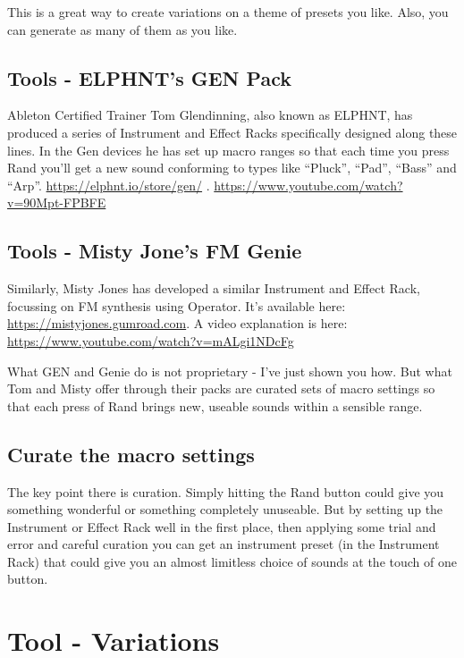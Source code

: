 \documentclass[
  12pt,
  letterpaper,
  oneside,
  open=any]{scrbook}
\begin{document}
This is a great way to create variations on a theme of presets you like.
Also, you can generate as many of them as you like.

\section{Tools - ELPHNT's GEN Pack}\label{tools---elphnts-gen-pack}

Ableton Certified Trainer Tom Glendinning, also known as ELPHNT, has
produced a series of Instrument and Effect Racks specifically designed
along these lines. In the Gen devices he has set up macro ranges so that
each time you press Rand you'll get a new sound conforming to types like
``Pluck'', ``Pad'', ``Bass'' and ``Arp''.
\url{https://elphnt.io/store/gen/} .
\url{https://www.youtube.com/watch?v=90Mpt-FPBFE}

\section{Tools - Misty Jone's FM
Genie}\label{tools---misty-jones-fm-genie}

Similarly, Misty Jones has developed a similar Instrument and Effect
Rack, focussing on FM synthesis using Operator. It's available here:
\url{https://mistyjones.gumroad.com}. A video explanation is here:
\url{https://www.youtube.com/watch?v=mALgi1NDcFg}

What GEN and Genie do is not proprietary - I've just shown you how. But
what Tom and Misty offer through their packs are curated sets of macro
settings so that each press of Rand brings new, useable sounds within a
sensible range.

\section{Curate the macro settings}\label{curate-the-macro-settings}

The key point there is curation. Simply hitting the Rand button could
give you something wonderful or something completely unuseable. But by
setting up the Instrument or Effect Rack well in the first place, then
applying some trial and error and careful curation you can get an
instrument preset (in the Instrument Rack) that could give you an almost
limitless choice of sounds at the touch of one button.


\chapter{Tool - Variations}\label{Chapter-025-Tool-Variations}
\end{document}
